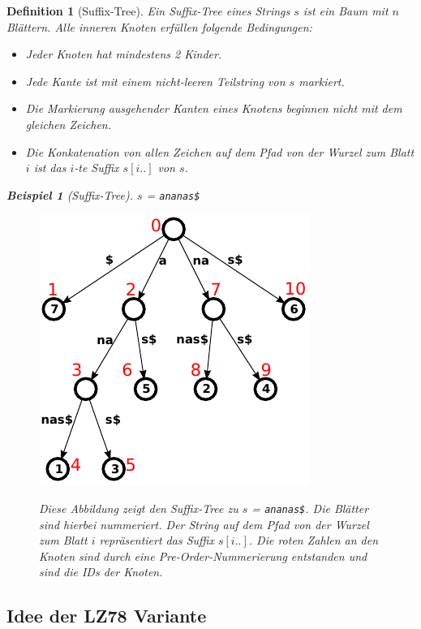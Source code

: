 \documentclass[a4paper,11pt]{scrartcl}%
\theoremstyle{change}
\theoremstyle{nonumberplain}
\theoremstyle{change}
\newtheorem{definition}[theorem]{Definition}
\theoremstyle{nonumberplain}
\theoremstyle{change}
\newtheorem{beispiel}[theorem]{Beispiel}
\theoremstyle{nonumberplain}
\begin{document}
	\begin{definition}[Suffix-Tree]
		Ein Suffix-Tree eines Strings $s$ ist ein Baum mit $n$ Blättern. Alle inneren Knoten erfüllen folgende Bedingungen:
		\begin{itemize}
			\item Jeder Knoten hat mindestens 2 Kinder.
			\item Jede Kante ist mit einem nicht-leeren Teilstring von $s$ markiert.
			\item Die Markierung ausgehender Kanten eines Knotens beginnen nicht mit dem gleichen Zeichen.
			\item Die Konkatenation von allen Zeichen auf dem Pfad von der Wurzel zum Blatt $i$ ist das $i$-te Suffix $s[i..]$ von $s$.
		\end{itemize}
		\begin{beispiel}[Suffix-Tree]
			$s$ = \texttt{ananas\$}
			\begin{figure}
				\centering
				  \includegraphics[scale=0.8]{ananas_suffixTree_inorder}
				  \cite{suffixtreeurl}
				  \caption{Diese Abbildung zeigt den Suffix-Tree zu $s$ = \texttt{ananas\$}. Die Blätter sind hierbei nummeriert. Der String auf dem Pfad von der Wurzel zum Blatt $i$ repräsentiert das Suffix $s[i..]$. Die roten Zahlen an den Knoten sind durch eine Pre-Order-Nummerierung entstanden und sind die IDs der Knoten. }
				  \label{fig:suffixTree}
			\end{figure}
		\end{beispiel}
		
	\end{definition}
	\newpage
	\subsection{Idee der LZ78 Variante}
\end{document}
